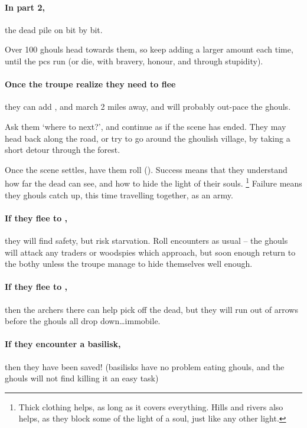 
\paragraph{In part 2,}
the dead pile on bit by bit.



Over 100 ghouls head towards them, so keep adding a larger amount each time, until the \glspl{pc} run (or die, with bravery, honour, and through stupidity).

\paragraph{Once the troupe realize they need to flee}
they can add , and march 2 miles away, and will probably out-pace the ghouls.

Ask them `where to next?', and continue as if the scene has ended.
They may head back along the road, or try to go around the ghoulish \gls{village}, by taking a short detour through the forest.

Once the scene settles, have them roll  (\tn[12]).
Success means that they understand how far the dead can see, and how to hide the light of their souls.%
\footnote{Thick clothing helps, as long as it covers everything. Hills and rivers also helps, as they block some of the light of a soul, just like any other light.}
Failure means they ghouls catch up, this time travelling together, as an army.

\paragraph{If they flee to ,}
they will find safety, but risk starvation.
Roll encounters as usual -- the ghouls will attack any traders or woodspies which approach, but soon enough return to the \gls{bothy} unless the troupe manage to hide themselves well enough.

\paragraph{If they flee to ,}
then the archers there can help pick off the dead, but they will run out of arrows before the ghouls all drop down\ldots immobile.

\paragraph{If they encounter a basilisk,}
then they have been saved!
(basilisks have no problem eating ghouls, and the ghouls will not find killing it an easy task)

